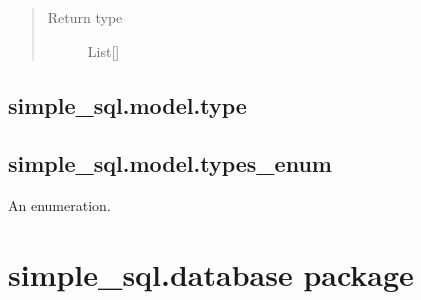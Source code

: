\documentclass[letterpaper,10pt,english]{sphinxmanual}
\begin{document}
\begin{fulllineitems}
\begin{fulllineitems}
\begin{quote}
\begin{description}
\item[{Return type}] \leavevmode
\sphinxAtStartPar
List{[}{\hyperref[\detokenize{model:mini_sql.model.foreign_key.ForeignKey}]{}}{]}

\end{description}\end{quote}

\end{fulllineitems}


\end{fulllineitems}



\section{simple\_sql.model.type}
\label{\detokenize{model:simple-sql-model-type}}

\begin{fulllineitems}
\label{\detokenize{model:mini_sql.model.type.Type}}
\end{fulllineitems}



\section{simple\_sql.model.types\_enum}
\label{\detokenize{model:simple-sql-model-types-enum}}

\begin{fulllineitems}
\label{\detokenize{model:mini_sql.model.types_enum.TypesEnum}}
\sphinxAtStartPar
An enumeration.

\end{fulllineitems}



\chapter{simple\_sql.database package}
\label{\detokenize{database:simple-sql-database-package}}\label{\detokenize{database::doc}}
\end{document}
